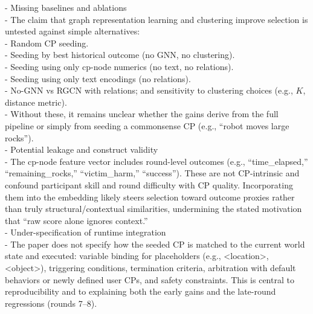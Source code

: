 \documentclass[letterpaper]{article} %
\begin{document}
- Missing baselines and ablations\\
\hspace*{1em}- The claim that graph representation learning and clustering improve selection is untested against simple alternatives:\\
\hspace*{2em}- Random CP seeding.\\
\hspace*{2em}- Seeding by best historical outcome (no GNN, no clustering).\\
\hspace*{2em}- Seeding using only cp-node numerics (no text, no relations).\\
\hspace*{2em}- Seeding using only text encodings (no relations).\\
\hspace*{2em}- No-GNN vs RGCN with relations; and sensitivity to clustering choices (e.g., $K$, distance metric).\\
\hspace*{1em}- Without these, it remains unclear whether the gains derive from the full pipeline or simply from seeding a commonsense CP (e.g., “robot moves large rocks”).\\[0.25em]
- Potential leakage and construct validity\\
\hspace*{1em}- The cp-node feature vector includes round-level outcomes (e.g., “time\_elapsed,” “remaining\_rocks,” “victim\_harm,” “success”). These are not CP-intrinsic and confound participant skill and round difficulty with CP quality. Incorporating them into the embedding likely steers selection toward outcome proxies rather than truly structural/contextual similarities, undermining the stated motivation that “raw score alone ignores context.”\\[0.25em]
- Under-specification of runtime integration\\
\hspace*{1em}- The paper does not specify how the seeded CP is matched to the current world state and executed: variable binding for placeholders (e.g., \textless{}location\textgreater{}, \textless{}object\textgreater{}), triggering conditions, termination criteria, arbitration with default behaviors or newly defined user CPs, and safety constraints. This is central to reproducibility and to explaining both the early gains and the late-round regressions (rounds 7–8).\\[0.25em]
\end{document}
